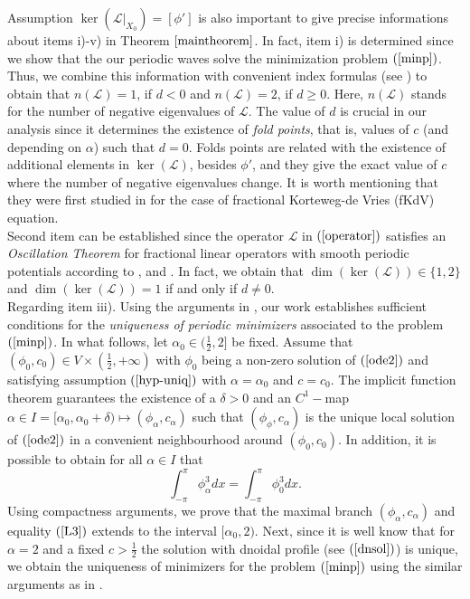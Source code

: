 \documentclass[12pt,reqno]{amsart}
\newcommand{\2}{L^2_{per}(0, T)}
\numberwithin{equation}{section}
\numberwithin{figure}{section}
\begin{document}
\indent  Assumption $\ker\left(\mathcal{L}|_{X_0}\right)=[\phi']$ is also important to give precise informations about items i)-v) in Theorem $\ref{maintheorem}$. In fact, item i) is determined since we show that the our periodic waves solve the minimization problem $(\ref{minp})$. Thus, we combine this information with convenient index formulas  (see \cite[Theorem 4.1]{pel-book}) to obtain that $n(\mathcal{L})=1$, if $d<0$ and $n(\mathcal{L})=2$, if $d\geq0$. Here, $n(\mathcal{L})$ stands for the number of negative eigenvalues of $\mathcal{L}$. The value of $d$ is crucial in our analysis since it determines the existence of \textit{fold points}, that is, values of $c$ (and depending on $\alpha$) such that $d=0$. Folds points are related with the existence of additional elements in $\ker(\mathcal{L})$, besides $\phi'$, and they give the exact value of $c$ where the number of negative eigenvalues change. It is worth mentioning that they were first studied in \cite{NPL} for the case of fractional Korteweg-de Vries (fKdV) equation. \\
\indent Second item can be established since the operator $\mathcal{L}$ in $(\ref{operator})$ satisfies an \textit{Oscillation Theorem} for fractional linear operators with smooth periodic potentials according to \cite{FL}, \cite{hur} and \cite{NPL}. In fact, we obtain that $\dim(\ker(\mathcal{L}))\in\{1,2\}$ and $\dim(\ker(\mathcal{L}))=1$ if and only if $d\neq0$.\\
\indent Regarding item iii). Using the arguments in \cite{FL}, our work establishes sufficient conditions for the \textit{uniqueness of periodic minimizers} associated to the problem $(\ref{minp})$. In what follows, let $\alpha_0\in(\frac{1}{2}, 2]$ be fixed. Assume that $(\phi_{0}, c_{0})\in V\times \left(\frac{1}{2},+\infty\right)$ with $\phi_0$ being a non-zero solution of $(\ref{ode2})$ and satisfying assumption $(\ref{hyp-uniq})$ with $\alpha=\alpha_0$ and $c=c_{0}$. The implicit function theorem guarantees the existence of a $\delta>0$ and an $C^1-$map $\alpha\in I=[\alpha_0,\alpha_0+\delta) \mapsto (\phi_{\alpha},c_{\alpha})$ such that $(\phi_{\phi},c_{\alpha})$ is the unique local solution of $(\ref{ode2})$ in a convenient neighbourhood around $(\phi_0,c_0)$. In addition, it is possible to obtain for all $\alpha\in I$ that
\begin{equation}\label{L3}
	\int_{-\pi}^{\pi}\phi_{\alpha}^3dx=\int_{-\pi}^{\pi}\phi_{0}^3dx.
\end{equation}
Using compactness arguments, we prove that the maximal branch $(\phi_{\alpha},c_{\alpha})$ and equality $(\ref{L3})$ extends to the interval $[\alpha_0,2)$. Next, since it is well know that for $\alpha=2$ and a fixed $c>\frac{1}{2}$ the solution with dnoidal profile (see $(\ref{dnsol})$) is unique, we obtain the uniqueness of minimizers for the problem $(\ref{minp})$ using the similar arguments as in \cite[Theorem 2.4]{FL}. \\
\end{document}
